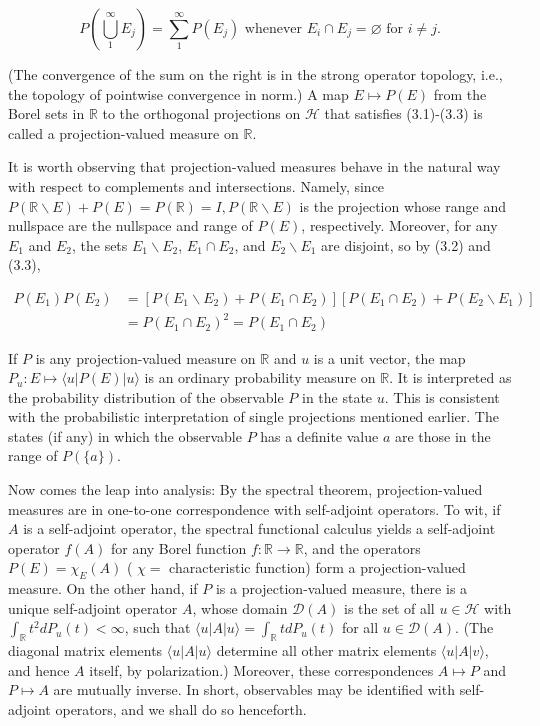\documentclass[10pt, letterpaper]{article}
\begin{document}
$$
P\left(\bigcup_{1}^{\infty} E_{j}\right)=\sum_{1}^{\infty} P\left(E_{j}\right) \text { whenever } E_{i} \cap E_{j}=\varnothing \text { for } i \neq j .
$$

(The convergence of the sum on the right is in the strong operator topology, i.e., the topology of pointwise convergence in norm.) A map $E \mapsto P(E)$ from the Borel sets in $\mathbb{R}$ to the orthogonal projections on $\mathcal{H}$ that satisfies (3.1)-(3.3) is called a projection-valued measure on $\mathbb{R}$.

It is worth observing that projection-valued measures behave in the natural way with respect to complements and intersections. Namely, since $P(\mathbb{R} \backslash E)+P(E)= P(\mathbb{R})=I, P(\mathbb{R} \backslash E)$ is the projection whose range and nullspace are the nullspace and range of $P(E)$, respectively. Moreover, for any $E_{1}$ and $E_{2}$, the sets $E_{1} \backslash E_{2}$, $E_{1} \cap E_{2}$, and $E_{2} \backslash E_{1}$ are disjoint, so by (3.2) and (3.3),

$$
\begin{aligned}
P\left(E_{1}\right) P\left(E_{2}\right) & =\left[P\left(E_{1} \backslash E_{2}\right)+P\left(E_{1} \cap E_{2}\right)\right]\left[P\left(E_{1} \cap E_{2}\right)+P\left(E_{2} \backslash E_{1}\right)\right] \\
& =P\left(E_{1} \cap E_{2}\right)^{2}=P\left(E_{1} \cap E_{2}\right)
\end{aligned}
$$

If $P$ is any projection-valued measure on $\mathbb{R}$ and $u$ is a unit vector, the map $P_{u}: E \mapsto\langle u| P(E)|u\rangle$ is an ordinary probability measure on $\mathbb{R}$. It is interpreted as the probability distribution of the observable $P$ in the state $u$. This is consistent with the probabilistic interpretation of single projections mentioned earlier. The states (if any) in which the observable $P$ has a definite value $a$ are those in the range of $P(\{a\})$.

Now comes the leap into analysis: By the spectral theorem, projection-valued measures are in one-to-one correspondence with self-adjoint operators. To wit, if $A$ is a self-adjoint operator, the spectral functional calculus yields a self-adjoint operator $f(A)$ for any Borel function $f: \mathbb{R} \rightarrow \mathbb{R}$, and the operators $P(E)=\chi_{E}(A)$ ( $\chi=$ characteristic function) form a projection-valued measure. On the other hand, if $P$ is a projection-valued measure, there is a unique self-adjoint operator $A$, whose domain $\mathcal{D}(A)$ is the set of all $u \in \mathcal{H}$ with $\int_{\mathbb{R}} t^{2} d P_{u}(t)<\infty$, such that $\langle u| A|u\rangle= \int_{\mathbb{R}} t d P_{u}(t)$ for all $u \in \mathcal{D}(A)$. (The diagonal matrix elements $\langle u| A|u\rangle$ determine all other matrix elements $\langle u| A|v\rangle$, and hence $A$ itself, by polarization.) Moreover, these correspondences $A \mapsto P$ and $P \mapsto A$ are mutually inverse. In short, observables may be identified with self-adjoint operators, and we shall do so henceforth.
\end{document}
